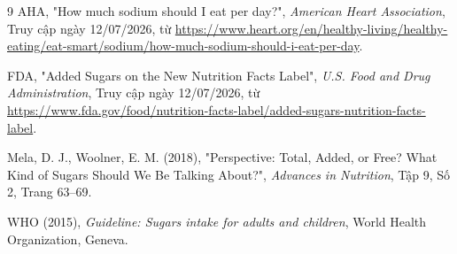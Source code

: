 \documentclass[12pt, a4paper]{report}
\begin{document}
\begin{thebibliography}{9}
AHA,
"How much sodium should I eat per day?",
\textit{American Heart Association}, Truy cập ngày 12/07/2026, từ \url{https://www.heart.org/en/healthy-living/healthy-eating/eat-smart/sodium/how-much-sodium-should-i-eat-per-day}.

FDA,
"Added Sugars on the New Nutrition Facts Label",
\textit{U.S. Food and Drug Administration}, Truy cập ngày 12/07/2026, từ \url{https://www.fda.gov/food/nutrition-facts-label/added-sugars-nutrition-facts-label}.

Mela, D. J., Woolner, E. M. (2018),
"Perspective: Total, Added, or Free? What Kind of Sugars Should We Be Talking About?",
\textit{Advances in Nutrition}, Tập 9, Số 2, Trang 63--69.

WHO (2015),
\textit{Guideline: Sugars intake for adults and children},
World Health Organization, Geneva.

\end{thebibliography}
\end{document}
